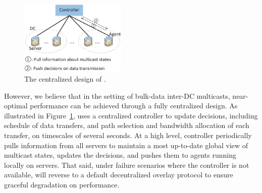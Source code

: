 \begin{figure}[t]
  \centering
  \includegraphics[width=2in]{images/framework.eps}
  \caption{The centralized design of \name.}
  \label{fig:framework}
\vspace{-0.4cm}
\end{figure}

However, we believe that in the setting of bulk-data inter-DC 
multicasts, near-optimal performance can be achieved
through a fully centralized design.
As illustrated in Figure~\ref{fig:framework}, \name uses a centralized controller to update decisions,
including schedule of data transfers, and path selection and
bandwidth allocation of each transfer, on timescales of
several seconds.
At a high level, \name controller periodically pulls information
from all servers to maintain a most up-to-date global view of
multicast states, updates the decisions, and pushes them
to agents running locally on servers.
That said, under failure scenarios where the controller is
not available, \name will reverse to a default decentralized
overlay protocol to ensure graceful degradation on performance.

